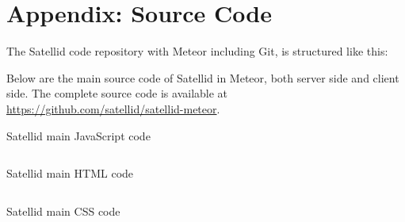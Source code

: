 \chapter{Appendix: Source Code}
\label{apx:source-code}

The Satellid code repository with Meteor including Git, is structured like this:


\noindent Below are the main source code of Satellid in Meteor, both server side and client side.
The complete source code is available at \url{https://github.com/satellid/satellid-meteor}.

\begin{listing}[!htp]
  \caption{Satellid main JavaScript code}
  \inputminted{javascript}{\dir/code/app.js}
  \label{lst:satellid-code-js}
\end{listing}

\begin{listing}[!htp]
  \caption{Satellid main HTML code}
  \inputminted{html}{\dir/code/app.html}
  \label{lst:satellid-code-html}
\end{listing}

\begin{listing}[!htp]
  \caption{Satellid main CSS code}
  \inputminted{css}{\dir/code/app.css}
  \label{lst:satellid-code-css}
\end{listing}
